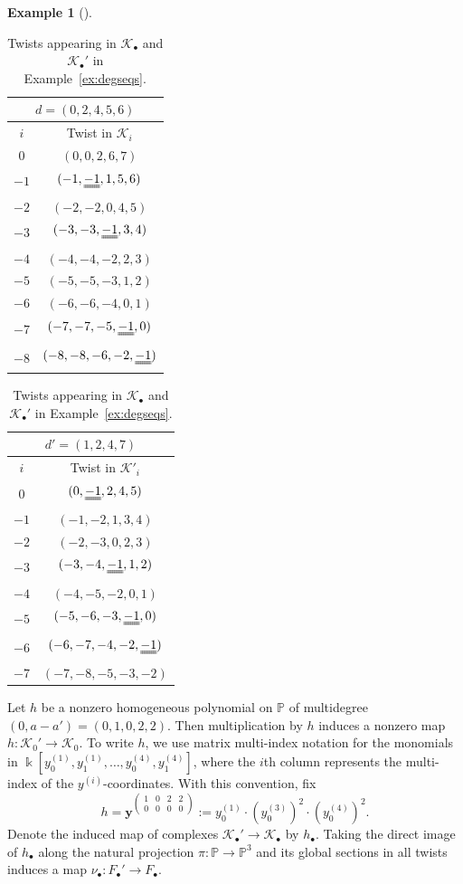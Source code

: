 \documentclass[12pt]{amsart}
\theoremstyle{definition}
\newtheorem{eg}[equation]{Example}
\newenvironment{example}[1][]{\begin{eg}[#1] \pushQED{\qed}}{\popQED \end{eg}}
\newcommand{\KK}{\mathcal{K}}
\newcommand{\PP}{\mathbb{P}}
\begin{document}
\begin{example}
\begin{table}[h]
\parbox{5cm}{%
\begin{tabular}{|c|c|}%
\multicolumn{2}{c}{$d = (0, 2, 4, 5, 6)$}\\%
\hline
$i$ & Twist in $\KK_i$\\\hline
0  &$(0,0,  2,  6,  7)$\\%
$-1$ &$(-1,\uuline{-1},  1,  5,  6)$ \\%
$-2$ &$(-2,-2,  0,  4,  5)$ \\%
$-3$ &$(-3,-3,  \uuline{-1},  3,  4)$ \\%
$-4$ &$(-4,-4,  -2,  2,  3)$ \\%
$-5$ &$(-5,-5,  -3,  1,  2)$ \\%
$-6$ &$(-6,-6,  -4,  0,  1)$ \\%
$-7$ &$(-7,-7,  -5,  \uuline{-1},  0)$\\%
$-8$ &$(-8,-8,  -6,  -2,  \uuline{-1})$ \\%
\hline%
\end{tabular}}
\parbox{5cm}{%
\begin{tabular}{|c|c|}%
\multicolumn{2}{c}{$d' = (1, 2, 4, 7)$} \\
\hline
$i$& Twist in $\KK'_i$\\\hline
$ 0$ & $(0,\uuline{-1}, 2, 4, 5)$\\
$-1$ & $(-1,-2, 1, 3, 4)$\\
$-2$ & $(-2,-3, 0, 2, 3)$\\
$-3$ & $(-3,-4, \uuline{-1}, 1, 2)$\\
$-4$ & $(-4,-5, -2, 0, 1)$\\
$-5$ & $(-5,-6, -3, \uuline{-1}, 0)$\\
$-6$ & $(-6,-7, -4, -2, \uuline{-1})$\\
$-7$ & $(-7,-8, -5, -3, -2)$\\
\hline
\end{tabular}
\phantom{ALIGNMENT line}
\vspace*{1.5mm}
}
\caption{Twists appearing in $\KK_\bullet$ and $\KK_\bullet'$ in Example~\ref{ex:degseqs}.}
\label{tab:propaedeuticTwists}
\end{table}

Let $h$ be a nonzero homogeneous polynomial on
$\PP$ of multidegree $(0,a-a')= (0,1,0,2,2)$. Then multiplication by
$h$ induces a nonzero map $h \colon \KK_0' \to \KK_0$. To write $h$, 
we use matrix multi-index notation for the monomials in
$\Bbbk[y_0^{(1)}, y_1^{(1)}, \dots, y_0^{(4)}, y_1^{(4)}]$, where the
$i$th column represents the multi-index of the
$y^{(i)}$-coordinates. With this convention, fix 
\[
h = 
\mathbf{y}^{\left(\begin{smallmatrix}1&0&2&2\\0&0&0&0
\end{smallmatrix}\right)} 
:= y^{(1)}_0\cdot \left( y^{(3)}_0\right)^2\cdot
\left(y^{(4)}_0\right)^{2}.
\]
Denote the induced map of complexes $\KK_\bullet'\to \KK_\bullet$ by
$h_\bullet$.
Taking the direct image of $h_\bullet$ along the natural projection
$\pi\colon \PP\to\PP^3$ and its global sections in all twists induces 
a map $\nu_\bullet\colon  F_\bullet'\to F_\bullet$.
%


\end{example}
\end{document}
